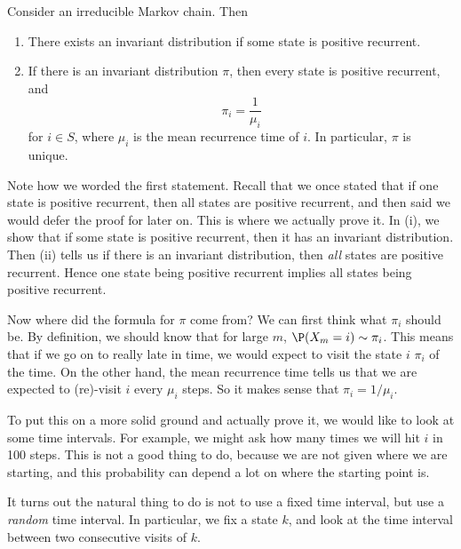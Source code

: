 \documentclass[a4paper]{article}
\begin{document}
\begin{thm}
  Consider an irreducible Markov chain. Then
  \begin{enumerate}
    \item There exists an invariant distribution if some state is positive recurrent.
    \item If there is an invariant distribution $\pi$, then every state is positive recurrent, and
      \[
        \pi_i = \frac{1}{\mu_i}
      \]
      for $i \in S$, where $\mu_i$ is the mean recurrence time of $i$. In particular, $\pi$ is unique.
  \end{enumerate}
\end{thm}
Note how we worded the first statement. Recall that we once stated that if one state is positive recurrent, then all states are positive recurrent, and then said we would defer the proof for later on. This is where we actually prove it. In (i), we show that if some state is positive recurrent, then it has an invariant distribution. Then (ii) tells us if there is an invariant distribution, then \emph{all} states are positive recurrent. Hence one state being positive recurrent implies all states being positive recurrent.

Now where did the formula for $\pi$ come from? We can first think what $\pi_i$ should be. By definition, we should know that for large $m$, $\P(X_m = i) \sim \pi_i$. This means that if we go on to really late in time, we would expect to visit the state $i$ $\pi_i$ of the time. On the other hand, the mean recurrence time tells us that we are expected to (re)-visit $i$ every $\mu_i$ steps. So it makes sense that $\pi_i = 1/\mu_i$.

To put this on a more solid ground and actually prove it, we would like to look at some time intervals. For example, we might ask how many times we will hit $i$ in 100 steps. This is not a good thing to do, because we are not given where we are starting, and this probability can depend a lot on where the starting point is.

It turns out the natural thing to do is not to use a fixed time interval, but use a \emph{random} time interval. In particular, we fix a state $k$, and look at the time interval between two consecutive visits of $k$.
\end{document}
